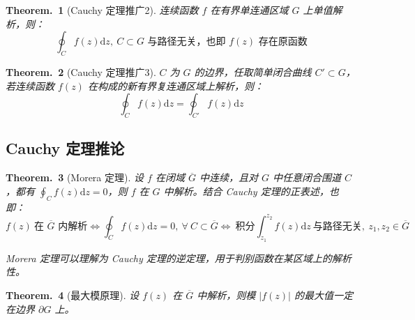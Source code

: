 \documentclass[UTF8]{report}
\theoremstyle{MyLineTheoremStyle} %
\newtheorem{LineTheorem}{Theorem.\,}
\theoremstyle{MyBlockTheoremStyle} %
\newtheorem{BlockTheorem}[LineTheorem]{Theorem.\,} %
\theoremstyle{MySubsubsectionStyle} %
\begin{document}
\begin{BlockTheorem}[Cauchy 定理推广2]\label{Cauchy 定理推广2}
    连续函数 $f$ 在有界单连通区域 $G$ 上单值解析，则：
    \begin{equation}
    \text{$\oint_C f(z)\mathrm{d}z,\ C \subset G$ 与路径无关，也即 $f(z)$ 存在原函数}
    \end{equation}
\end{BlockTheorem}

\begin{BlockTheorem}[Cauchy 定理推广3]\label{Cauchy 定理推广3}
    $C$ 为 $G$ 的边界，任取简单闭合曲线 $C' \subset G$，若连续函数 $f(z)$ 在构成的新有界复连通区域上解析，则：
    \begin{equation}
        \oint_{C} f(z) \mathrm{d}z = \oint_{C'} f(z) \mathrm{d}z
    \end{equation}
\end{BlockTheorem}

\subsection{Cauchy 定理推论}

\begin{BlockTheorem}[Morera 定理]\label{Morera 定理}
设 $f$ 在闭域 $\overline{G} $ 中连续，且对 $G$ 中任意闭合围道 $C$，都有 $\oint_{C} f(z) \mathrm{d}z = 0$，则 $f$ 在 $G$ 中解析。结合 Cauchy 定理的正表述，也即：
\begin{equation}
f(z) \ \text{在 $\overline{G} $ 内解析} \Longleftrightarrow  \oint_{C} f(z) \mathrm{d}z = 0,\ \forall\ C \subset \overline{G}  \Longleftrightarrow  \ \text{积分} \int_{z_1}^{z_2} f(z) \mathrm{d}z \ \text{与路径无关},\ z_1, z_2 \in \overline{G} 
\end{equation}

Morera 定理可以理解为 Cauchy 定理的逆定理，用于判别函数在某区域上的解析性。
\end{BlockTheorem}

\begin{LineTheorem}[最大模原理]\label{最大模原理}
    设 $f(z)$ 在 $\overline{G}$ 中解析，则模 $| f(z) |$ 的最大值一定在边界 $\partial G$ 上。
\end{LineTheorem}
\end{document}
